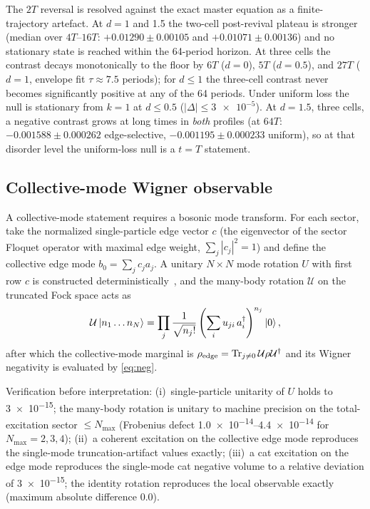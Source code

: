 \documentclass[aps,pra,preprint,superscriptaddress,amsmath,amssymb]{revtex4-2}
\begin{document}
The $2T$ reversal is resolved against the exact master equation as a finite-trajectory artefact. At $d=\num{1}$ and \num{1.5} the two-cell post-revival plateau is stronger (median over $4T$--$16T$: $+\num{0.01290}\pm\num{0.00105}$ and $+\num{0.01071}\pm\num{0.00136}$) and no stationary state is reached within the \num{64}-period horizon. At three cells the contrast decays monotonically to the floor by $6T$ ($d=\num{0}$), $5T$ ($d=\num{0.5}$), and $27T$ ($d=\num{1}$, envelope fit $\tau\approx\num{7.5}$ periods); for $d\le\num{1}$ the three-cell contrast never becomes significantly positive at any of the \num{64} periods. Under uniform loss the null is stationary from $k=\num{1}$ at $d\le\num{0.5}$ ($|\Delta|\le\num{3e-5}$). At $d=\num{1.5}$, three cells, a negative contrast grows at long times in \emph{both} profiles (at $64T$: $-\num{0.001588}\pm\num{0.000262}$ edge-selective, $-\num{0.001195}\pm\num{0.000233}$ uniform), so at that disorder level the uniform-loss null is a $t=T$ statement.

\subsection{Collective-mode Wigner observable}
\label{sec:collective-wigner}

A collective-mode statement requires a bosonic mode transform. For each sector, take the normalized single-particle edge vector $c$ (the eigenvector of the sector Floquet operator with maximal edge weight, $\sum_j|c_j|^2=1$) and define the collective edge mode $b_0=\sum_j c_j a_j$. A unitary $N\times N$ mode rotation $U$ with first row $c$ is constructed deterministically~\cite{Weedbrook2012}, and the many-body rotation $\mathcal{U}$ on the truncated Fock space acts as
\begin{equation}\label{eq:mode-rotation}
\mathcal{U}\ket{n_1\dots n_N}=\prod_j\frac{1}{\sqrt{n_j!}}
\left(\sum_i u_{ji}\,a_i^\dagger\right)^{n_j}\ket{0},
\end{equation}
after which the collective-mode marginal is $\rho_{\rm edge}=\mathrm{Tr}_{j\ne0}\,\mathcal{U}\rho\mathcal{U}^\dagger$ and its Wigner negativity is evaluated by \cref{eq:neg}.

Verification before interpretation: (i)~single-particle unitarity of $U$ holds to \num{3e-15}; the many-body rotation is unitary to machine precision on the total-excitation sector $\le N_{\max}$ (Frobenius defect \num{1.0e-14}--\num{4.4e-14} for $N_{\max}=\num{2},\num{3},\num{4}$); (ii)~a coherent excitation on the collective edge mode reproduces the single-mode truncation-artifact values exactly; (iii)~a cat excitation on the edge mode reproduces the single-mode cat negative volume to a relative deviation of \num{3e-15}; the identity rotation reproduces the local observable exactly (maximum absolute difference \num{0.0}).
\end{document}
